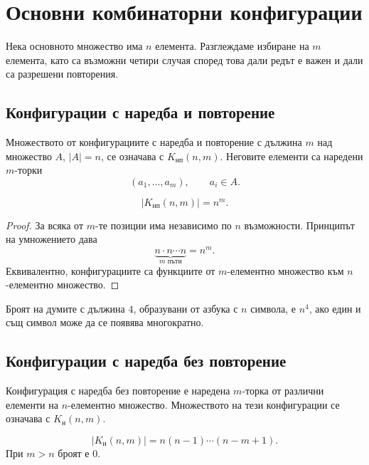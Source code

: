 \section{Основни комбинаторни конфигурации}\label{s:2.2}

Нека основното множество има $n$ елемента. Разглеждаме избиране на $m$ елемента, като са възможни четири случая според това дали редът е важен и дали са разрешени повторения.

\subsection{Конфигурации с наредба и повторение}\label{s:2.2.1}

\begin{defn}
Множеството от конфигурациите с наредба и повторение с дължина $m$ над множество $A$, $|A|=n$, се означава с $K_{\mathrm{нп}}(n,m)$. Неговите елементи са наредени $m$-торки
\[
(a_1,\ldots,a_m),\qquad a_i\in A.
\]
\end{defn}

\begin{thm}
\[
|K_{\mathrm{нп}}(n,m)|=n^m.
\]
\end{thm}

\begin{proof}
За всяка от $m$-те позиции има независимо по $n$ възможности. Принципът на умножението дава
\[
\underbrace{n\cdot n\cdots n}_{m\text{ пъти}}=n^m.
\]
Еквивалентно, конфигурациите са функциите от $m$-елементно множество към $n$-елементно множество.
\end{proof}

\begin{example}
Броят на думите с дължина $4$, образувани от азбука с $n$ символа, е $n^4$, ако един и същ символ може да се появява многократно.
\end{example}

\subsection{Конфигурации с наредба без повторение}\label{s:2.2.2}

\begin{defn}
Конфигурация с наредба без повторение е наредена $m$-торка от различни елементи на $n$-елементно множество. Множеството на тези конфигурации се означава с $K_{\mathrm{н}}(n,m)$.
\end{defn}

\begin{thm}
\[
|K_{\mathrm{н}}(n,m)|
=
n(n-1)\cdots(n-m+1).
\]
При $m>n$ броят е $0$.
\end{thm}

